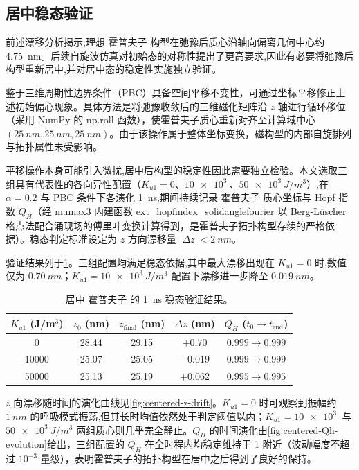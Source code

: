 \subsection{居中稳态验证}
前述漂移分析揭示,理想 霍普夫子 构型在弛豫后质心沿轴向偏离几何中心约 \SI{4.75}{nm}。后续自旋波仿真对初始态的对称性提出了更高要求,因此有必要将弛豫后构型重新居中,并对居中态的稳定性实施独立验证。

鉴于三维周期性边界条件（PBC）具备空间平移不变性，可通过坐标平移修正上述初始偏心现象。具体方法是将弛豫收敛后的三维磁化矩阵沿 $z$ 轴进行循环移位（采用 NumPy 的 np.roll 函数），使霍普夫子质心重新对齐至计算域中心 $(\SI{25}{nm}, \SI{25}{nm}, \SI{25}{nm})$。由于该操作属于整体坐标变换，磁构型的内部自旋排列与拓扑属性未受影响。

平移操作本身可能引入微扰,居中后构型的稳定性因此需要独立检验。本文选取三组具有代表性的各向异性配置（$K_{u1} = 0$、$\SI{10e3}{}$、$\SI{50e3}{J/m^3}$）,在 $\alpha = 0.2$ 与 PBC 条件下各演化 \SI{1}{ns},期间持续记录 霍普夫子 质心坐标与 Hopf 指数 $Q_H$（经 mumax3 内建函数 ext\_hopfindex\_solidanglefourier 以 Berg-Lüscher 格点法配合涌现场的傅里叶变换计算得到，是霍普夫子拓扑构型存续的严格依据）。稳态判定标准设定为 $z$ 方向漂移量 $|\Delta z| < \SI{2}{nm}$。

验证结果列于\cref{tab:centered-stability}。三组配置均满足稳态依据,其中最大漂移出现在 $K_{u1} = 0$ 时,数值仅为 $\SI{0.70}{nm}$；$K_{u1} = \SI{10e3}{J/m^3}$ 配置下漂移进一步降至 $\SI{0.019}{nm}$。

\begin{table}[htbp]
  \centering
  \caption{居中 霍普夫子 的 \SI{1}{ns} 稳态验证结果。}
  \label{tab:centered-stability}
  \begin{tabular}{ccccc}
    \toprule
    $K_{u1}$ (J/m$^3$) & $z_0$ (nm) & $z_{\text{final}}$ (nm) & $\Delta z$ (nm) & $Q_H$ ($t_0 \to t_{\text{end}}$) \\
    \midrule
    0     & 28.44 & 29.15 & $+0.70$ & $0.999 \to 0.999$ \\
    10000 & 25.07 & 25.05 & $-0.019$ & $0.999 \to 0.999$ \\
    50000 & 25.13 & 25.19 & $+0.062$ & $0.995 \to 0.995$ \\
    \bottomrule
  \end{tabular}
\end{table}

$z$ 向漂移随时间的演化曲线见\cref{fig:centered-z-drift}。$K_{u1} = 0$ 时可观察到振幅约 $\SI{1}{nm}$ 的呼吸模式振荡,但其长时均值依然处于判定阈值以内；$K_{u1} = \SI{10e3}{}$ 与 $\SI{50e3}{J/m^3}$ 两组质心则几乎完全静止。$Q_H$ 的时间演化由\cref{fig:centered-Qh-evolution}给出，三组配置的 $Q_H$ 在全时程内均稳定维持于 1 附近（波动幅度不超过 $10^{-3}$ 量级），表明霍普夫子的拓扑构型在居中之后得到了良好的保持。


